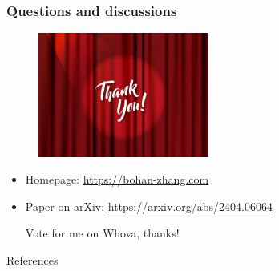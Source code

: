 \documentclass[aspectratio=169]{beamer}
\begin{document}
\begin{frame}
\frametitle{Questions and discussions}%

	\vspace{-0.15in}
\begin{figure}[h!]
	\centering
	\includegraphics[width=0.5\textwidth]{end.jpg}
\end{figure}

\Large
\begin{center}
	\begin{itemize}
		\centering
		\vspace{-0.05in}
		
		\item[] \small\color{purple}Homepage: {\color{blue}   \url{https://bohan-zhang.com}}
            \item[] \small\color{purple}Paper on arXiv: {\color{blue} \url{https://arxiv.org/abs/2404.06064}}

    \vspace{0.1cm}
  {\large\color{black} Vote for me on Whova, thanks!}
   
	\end{itemize}
\end{center}


\end{frame}



\begin{frame}[noframenumbering]{References}
\footnotesize
\vspace{-0.02in}
	
			
\end{frame}
\end{document}
